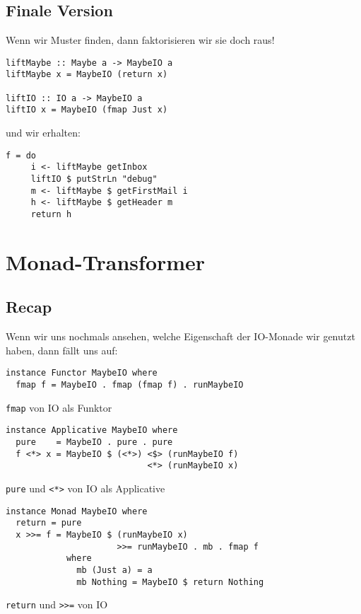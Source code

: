 \documentclass{beamer}
\begin{document}
\subsection{Finale Version}

\begin{frame}[fragile]
Wenn wir Muster finden, dann faktorisieren wir sie doch raus!
\begin{verbatim}
liftMaybe :: Maybe a -> MaybeIO a
liftMaybe x = MaybeIO (return x)

liftIO :: IO a -> MaybeIO a
liftIO x = MaybeIO (fmap Just x)
\end{verbatim}
\pause
und wir erhalten:
\begin{verbatim}
f = do
     i <- liftMaybe getInbox
     liftIO $ putStrLn "debug"
     m <- liftMaybe $ getFirstMail i
     h <- liftMaybe $ getHeader m
     return h
\end{verbatim}
\end{frame}

\section{Monad-Transformer}

\subsection{Recap}

\begin{frame}[fragile]
Wenn wir uns nochmals ansehen, welche Eigenschaft der IO-Monade wir genutzt haben, dann fällt uns auf:
\pause
\begin{verbatim}
instance Functor MaybeIO where
  fmap f = MaybeIO . fmap (fmap f) . runMaybeIO
\end{verbatim}
\texttt{fmap} von IO als Funktor
\pause
\begin{verbatim}
instance Applicative MaybeIO where
  pure    = MaybeIO . pure . pure
  f <*> x = MaybeIO $ (<*>) <$> (runMaybeIO f)
                            <*> (runMaybeIO x)
\end{verbatim}
\texttt{pure} und \texttt{<*>} von IO als Applicative
\pause
\begin{verbatim}
instance Monad MaybeIO where
  return = pure
  x >>= f = MaybeIO $ (runMaybeIO x)
                      >>= runMaybeIO . mb . fmap f
            where
              mb (Just a) = a
              mb Nothing = MaybeIO $ return Nothing
\end{verbatim}
\texttt{return} und \texttt{>>=} von IO
\end{frame}
\end{document}
